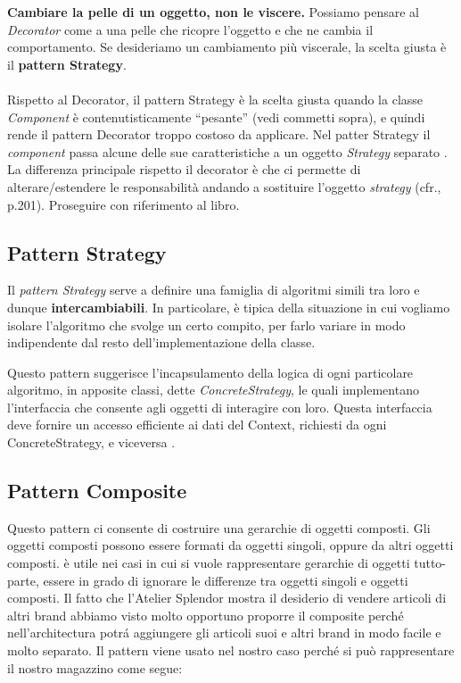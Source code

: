 \documentclass[12pt]{article}
\begin{document}
\textbf{Cambiare la pelle di un oggetto, non le viscere.} Possiamo pensare al {\em Decorator} come a una pelle che ricopre l'oggetto e che ne cambia il comportamento. Se desideriamo un cambiamento più viscerale, la scelta giusta è il \textbf{pattern Strategy}.
\\
\\
Rispetto al Decorator, il pattern Strategy è la scelta giusta quando la classe {\em Component} è contenutisticamente ``pesante'' (vedi commetti sopra), e quindi rende il pattern Decorator troppo costoso da applicare.
Nel patter Strategy il {\em component} passa alcune delle sue caratteristiche a un oggetto {\em Strategy} separato \cite{gof_sunt}.
La differenza principale rispetto il decorator è che ci permette di alterare/estendere le responsabilità andando a sostituire l'oggetto {\em strategy} (cfr.\cite{gof_riferimento}, p.201).
Proseguire con riferimento al libro.


\subsection{Pattern Strategy}

Il {\em pattern Strategy} serve a definire una famiglia di algoritmi simili tra loro e dunque \textbf{intercambiabili}. In particolare, è tipica della situazione in cui vogliamo isolare l’algoritmo che svolge un certo compito, per farlo variare in modo indipendente dal resto dell’implementazione della classe.

Questo pattern suggerisce l’incapsulamento della logica di ogni
particolare algoritmo, in apposite classi, dette {\em ConcreteStrategy}, le quali implementano l’interfaccia che consente agli oggetti di interagire con loro. Questa interfaccia deve fornire un accesso efficiente ai dati del Context, richiesti da ogni ConcreteStrategy, e viceversa \cite{gof_sunt}.



\subsection{Pattern Composite}
Questo pattern ci consente di costruire una gerarchie di oggetti composti. Gli oggetti composti possono essere formati da oggetti singoli, oppure da altri oggetti composti. è utile nei casi in cui si vuole rappresentare gerarchie di oggetti tutto-parte, essere in grado di ignorare le differenze tra oggetti singoli e oggetti composti. Il fatto che l'Atelier Splendor mostra il desiderio di vendere articoli di altri brand abbiamo visto molto opportuno proporre il composite perch\'e nell'architectura potr\'a aggiungere gli articoli suoi e altri brand in modo facile e molto separato.
Il pattern viene usato nel nostro caso perché si può rappresentare il nostro magazzino come segue:
\end{document}
